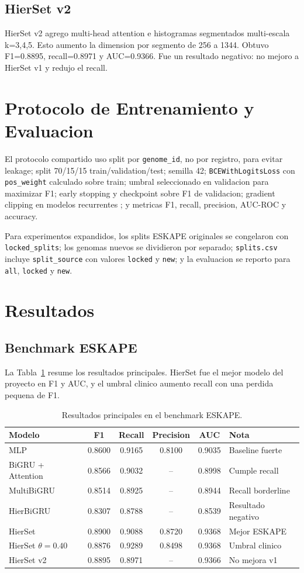 \documentclass[journal,transmag]{../ieee_latex_template/IEEEtran}
\begin{document}
\subsection{HierSet v2}
HierSet v2 agrego multi-head attention e histogramas segmentados multi-escala k=3,4,5. Esto aumento la dimension por segmento de 256 a 1344. Obtuvo F1=0.8895, recall=0.8971 y AUC=0.9366. Fue un resultado negativo: no mejoro a HierSet v1 y redujo el recall.

\section{Protocolo de Entrenamiento y Evaluacion}
El protocolo compartido uso split por \texttt{genome\_id}, no por registro, para evitar leakage; split 70/15/15 train/validation/test; semilla 42; \texttt{BCEWithLogitsLoss} con \texttt{pos\_weight} calculado sobre train; umbral seleccionado en validacion para maximizar F1; early stopping y checkpoint sobre F1 de validacion; gradient clipping en modelos recurrentes \cite{pascanu2013}; y metricas F1, recall, precision, AUC-ROC y accuracy.

Para experimentos expandidos, los splits ESKAPE originales se congelaron con \texttt{locked\_splits}; los genomas nuevos se dividieron por separado; \texttt{splits.csv} incluye \texttt{split\_source} con valores \texttt{locked} y \texttt{new}; y la evaluacion se reporto para \texttt{all}, \texttt{locked} y \texttt{new}.

\section{Resultados}
\subsection{Benchmark ESKAPE}
La Tabla~\ref{tab:eskape-results} resume los resultados principales. HierSet fue el mejor modelo del proyecto en F1 y AUC, y el umbral clinico aumento recall con una perdida pequena de F1.

\begin{table}[!t]
\caption{Resultados principales en el benchmark ESKAPE.}
\label{tab:eskape-results}
\centering
\small
\begin{tabular}{lccccp{}}
\toprule
Modelo & F1 & Recall & Precision & AUC & Nota \\
\midrule
MLP & 0.8600 & 0.9165 & 0.8100 & 0.9035 & Baseline fuerte \\
BiGRU + Attention & 0.8566 & 0.9032 & -- & 0.8998 & Cumple recall \\
MultiBiGRU & 0.8514 & 0.8925 & -- & 0.8944 & Recall borderline \\
HierBiGRU & 0.8307 & 0.8788 & -- & 0.8539 & Resultado negativo \\
HierSet & 0.8900 & 0.9088 & 0.8720 & 0.9368 & Mejor ESKAPE \\
HierSet $\theta=0.40$ & 0.8876 & 0.9289 & 0.8498 & 0.9368 & Umbral clinico \\
HierSet v2 & 0.8895 & 0.8971 & -- & 0.9366 & No mejora v1 \\
\bottomrule
\end{tabular}
\end{table}
\end{document}
